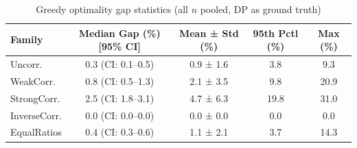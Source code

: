 \begin{table}[tb]
\centering
\caption{Greedy optimality gap statistics (all $n$ pooled, DP as ground truth)}
\label{tab:greedy-gap}
\begin{tabular}{lcccc}
\toprule
Family & Median Gap (\%) [95\% CI] & Mean ± Std (\%) & 95th Pctl (\%) & Max (\%) \\
\midrule
Uncorr. & 0.3 (CI: 0.1–0.5) & 0.9 ± 1.6 & 3.8 & 9.3 \\
WeakCorr. & 0.8 (CI: 0.5–1.3) & 2.1 ± 3.5 & 9.8 & 20.9 \\
StrongCorr. & 2.5 (CI: 1.8–3.1) & 4.7 ± 6.3 & 19.8 & 31.0 \\
InverseCorr. & 0.0 (CI: 0.0–0.0) & 0.0 ± 0.0 & 0.0 & 0.0 \\
EqualRatios & 0.4 (CI: 0.3–0.6) & 1.1 ± 2.1 & 3.7 & 14.3 \\
\bottomrule
\end{tabular}
\end{table}
